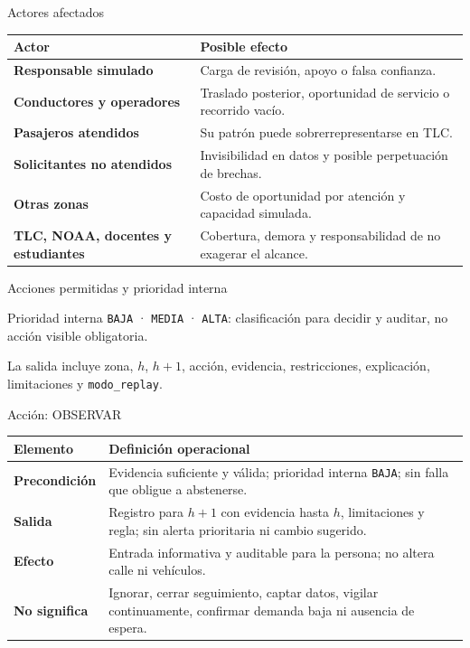 \documentclass[aspectratio=169,11pt]{beamer}
\newcommand{\accion}[1]{\texttt{#1}}
\begin{document}
\begin{frame}{Actores afectados}
  \small
  \begin{tabularx}{\textwidth}{>{\bfseries}p{}X}
    \toprule
    Actor & Posible efecto \\\midrule
    Responsable simulado & Carga de revisión, apoyo o falsa confianza. \\
    Conductores y operadores & Traslado posterior, oportunidad de servicio o recorrido vacío. \\
    Pasajeros atendidos & Su patrón puede sobrerrepresentarse en TLC. \\
    Solicitantes no atendidos & Invisibilidad en datos y posible perpetuación de brechas. \\
    Otras zonas & Costo de oportunidad por atención y capacidad simulada. \\
    TLC, NOAA, docentes y estudiantes & Cobertura, demora y responsabilidad de no exagerar el alcance. \\
    \bottomrule
  \end{tabularx}
\end{frame}

\begin{frame}{Acciones permitidas y prioridad interna}
  \centering
  \vfill
  \begin{block}{Prioridad interna}
    \accion{BAJA} · \accion{MEDIA} · \accion{ALTA}: clasificación para decidir y auditar, no acción visible obligatoria.
  \end{block}
  La salida incluye zona, $h$, $h+1$, acción, evidencia, restricciones, explicación, limitaciones y \texttt{modo\_replay}.
\end{frame}

\begin{frame}{Acción: OBSERVAR}
  \small
  \begin{tabularx}{\textwidth}{>{\bfseries}p{}X}
    \toprule
    Elemento & Definición operacional \\\midrule
    Precondición & Evidencia suficiente y válida; prioridad interna \accion{BAJA}; sin falla que obligue a abstenerse. \\
    Salida & Registro para $h+1$ con evidencia hasta $h$, limitaciones y regla; sin alerta prioritaria ni cambio sugerido. \\
    Efecto & Entrada informativa y auditable para la persona; no altera calle ni vehículos. \\
    No significa & Ignorar, cerrar seguimiento, captar datos, vigilar continuamente, confirmar demanda baja ni ausencia de espera. \\
    \bottomrule
  \end{tabularx}
\end{frame}
\end{document}
